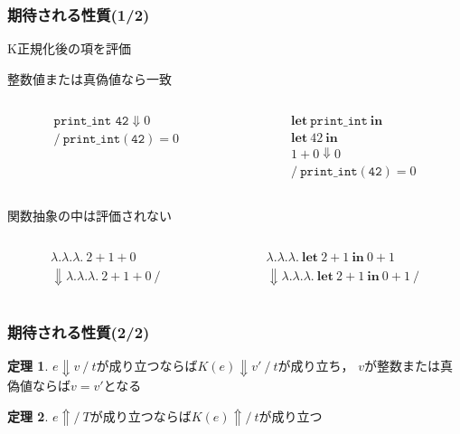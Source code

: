 \documentclass[dvipdfmx,cjk,xcolor=dvipsnames,envcountsect,notheorems,12pt]{beamer}
\theoremstyle{definition}
\newtheorem{theorem}{定理}
\newcommand{\keyword}[1]{\mathbf{#1}}
\newcommand{\LET}{\keyword{let}}
\newcommand{\IN}{\keyword{in}}
\begin{document}
\begin{frame}
	\frametitle{期待される性質(1/2)}
	{\LARGE K正規化後の項を評価}

	\vfill

	\Large 整数値または真偽値なら一致
	{\normalsize \begin{columns}
		\begin{column}{0.4\textwidth}
			\[\begin{array}{l}
				\texttt{print\_int 42}\Downarrow 0 \\
				/~\texttt{print\_int}(\texttt{42})=0
			\end{array}\]
		\end{column}
		\begin{column}{0.4\textwidth}
			\[ 
				\begin{array}{l}
					\LET~\texttt{print\_int}~\IN \\
					\LET~42~\IN \\
					1 + 0\Downarrow 0 \\
					/~\texttt{print\_int}(\texttt{42})=0
				\end{array}
			\]
		\end{column}
	\end{columns}}

	\vfill

	関数抽象の中は評価されない
	{\normalsize \begin{columns}
		\begin{column}{0.4\textwidth}
			\[ \begin{array}{l}
				\lambda.\lambda.\lambda.~2+1+0\\
				\Downarrow \lambda.\lambda.\lambda.~2+1+0~/
			\end{array} \]
		\end{column}
		\begin{column}{0.6\textwidth}
			\[ \begin{array}{l}
				\lambda.\lambda.\lambda.~\LET~2+1~\IN~0 + 1 \\
				\Downarrow \lambda.\lambda.\lambda.~\LET~2+1~\IN~0 + 1 ~/
			\end{array} \]
		\end{column}
	\end{columns}}
\end{frame}

\begin{frame}
	\frametitle{期待される性質(2/2)}
	{\Large
	\begin{theorem}\label{theorem:evalto-correctness}
		$e\Downarrow v~/~t$が成り立つならば$K(e)\Downarrow v'~/~t$が成り立ち，
		$v$が整数または真偽値ならば$v=v'$となる
	\end{theorem}
	\begin{theorem}
		$e\Uparrow/~T$が成り立つならば$K(e)\Uparrow/~t$が成り立つ
	\end{theorem}}
\end{frame}
\end{document}
